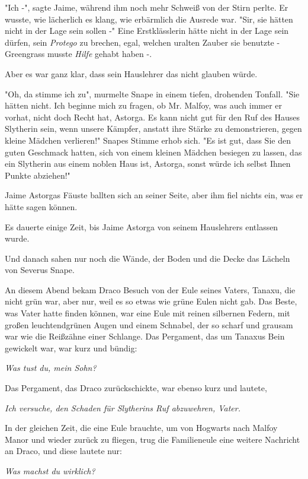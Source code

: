 {"Ich -", sagte Jaime, während ihm noch mehr Schweiß von der Stirn perlte. Er wusste, wie lächerlich es klang, wie erbärmlich die Ausrede war. "Sir, sie hätten nicht in der Lage sein sollen -" Eine Erstklässlerin hätte nicht in der Lage sein dürfen, sein \emph{Protego} zu brechen, egal, welchen uralten Zauber sie benutzte - Greengrass musste \emph{Hilfe} gehabt haben -.

Aber es war ganz klar, dass sein Hauslehrer das nicht glauben würde.

"Oh, da stimme ich zu", murmelte Snape in einem tiefen, drohenden Tonfall. "Sie hätten nicht. Ich beginne mich zu fragen, ob Mr. Malfoy, was auch immer er vorhat, nicht doch Recht hat, Astorga. Es kann nicht gut für den Ruf des Hauses Slytherin sein, wenn unsere Kämpfer, anstatt ihre Stärke zu demonstrieren, gegen kleine Mädchen verlieren!" Snapes Stimme erhob sich. "Es ist gut, dass Sie den guten Geschmack hatten, sich von einem kleinen Mädchen besiegen zu lassen, das ein Slytherin aus einem noblen Haus ist, Astorga, sonst würde ich selbst Ihnen Punkte abziehen!"

Jaime Astorgas Fäuste ballten sich an seiner Seite, aber ihm fiel nichts ein, was er hätte sagen können.

Es dauerte einige Zeit, bis Jaime Astorga von seinem Hauslehrers entlassen wurde.

Und danach sahen nur noch die Wände, der Boden und die Decke das Lächeln von Severus Snape.

An diesem Abend bekam Draco Besuch von der Eule seines Vaters, Tanaxu, die nicht grün war, aber nur, weil es so etwas wie grüne Eulen nicht gab. Das Beste, was Vater hatte finden können, war eine Eule mit reinen silbernen Federn, mit großen leuchtendgrünen Augen und einem Schnabel, der so scharf und grausam war wie die Reißzähne einer Schlange. Das Pergament, das um Tanaxus Bein gewickelt war, war kurz und bündig:

\emph{\emph{Was tust du, mein Sohn?}}

Das Pergament, das Draco zurückschickte, war ebenso kurz und lautete,

\emph{\emph{Ich versuche, den Schaden für Slytherins Ruf} \emph{abzuwehren, Vater.}}

In der gleichen Zeit, die eine Eule brauchte, um von Hogwarts nach Malfoy Manor und wieder zurück zu fliegen, trug die Familieneule eine weitere Nachricht an Draco, und diese lautete nur:

\emph{\emph{Was machst du wirklich?}}

}
